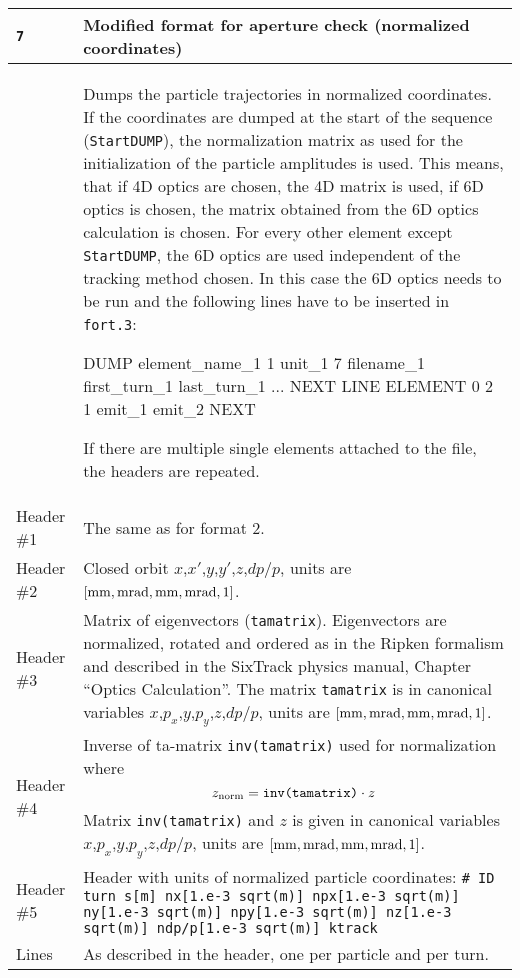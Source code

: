 \begin{center}
\begin{longtable}{|p{1.8cm}|p{13.8cm}|}
        \rowcolor{blue!15}
        \texttt{7} & Modified format for aperture check (normalized coordinates) \\
        \hline
        & Dumps the particle trajectories in normalized coordinates. If the coordinates are dumped at the start of the sequence (\texttt{StartDUMP}), the normalization matrix as used for the initialization of the particle amplitudes is used. This means, that if 4D optics are chosen, the 4D matrix is used, if 6D optics is chosen, the matrix obtained from the 6D optics calculation is chosen. For every other element except \texttt{StartDUMP}, the 6D optics are used independent of the tracking method chosen. In this case the 6D optics needs to be run and the following lines have to be inserted in \texttt{fort.3}:
            \bigskip
            \begin{cverbatim}
DUMP
element_name_1 1 unit_1 7 filename_1 first_turn_1 last_turn_1
...
NEXT
LINE
ELEMENT  0 2 1 emit_1 emit_2
NEXT
            \end{cverbatim} 
            \bigskip
            If there are multiple single elements attached to the file, the headers are repeated.\\
            \hline
            Header \#1 & The same as for format 2.\\
            \hline
            Header \#2 & Closed orbit  $x$,$x'$,$y$,$y'$,$z$,$dp/p$, units are $[\rm mm,mrad,mm,mrad,1]$.\\
            \hline
            Header \#3 & Matrix of eigenvectors (\texttt{tamatrix}). Eigenvectors are normalized, rotated and ordered as in the Ripken formalism and described in the SixTrack physics manual, Chapter ``Optics Calculation''. The matrix \texttt{tamatrix} is in canonical variables $x$,$p_x$,$y$,$p_y$,$z$,$dp/p$, units are $[\rm mm,mrad,mm,mrad,1]$. \\
            \hline
            Header \#4 & Inverse of ta-matrix \texttt{inv(tamatrix)} used for normalization where \begin{equation}
                z_{\rm norm}=\texttt{inv(tamatrix)}\cdot z
            \end{equation}
            Matrix \texttt{inv(tamatrix)} and $z$ is given in canonical variables $x$,$p_x$,$y$,$p_y$,$z$,$dp/p$, units are $[\rm mm,mrad,mm,mrad,1]$.\\
            \hline
            Header \#5 & Header with units of normalized particle coordinates:\newline
            \texttt{\# ID turn s[m] nx[1.e-3 sqrt(m)] npx[1.e-3 sqrt(m)] ny[1.e-3 sqrt(m)] npy[1.e-3 sqrt(m)] nz[1.e-3 sqrt(m)] ndp/p[1.e-3 sqrt(m)] ktrack} \\
            \hline
            Lines      & As described in the header, one per particle and per turn.\\
            \hline
            

\end{longtable}
\end{center}
